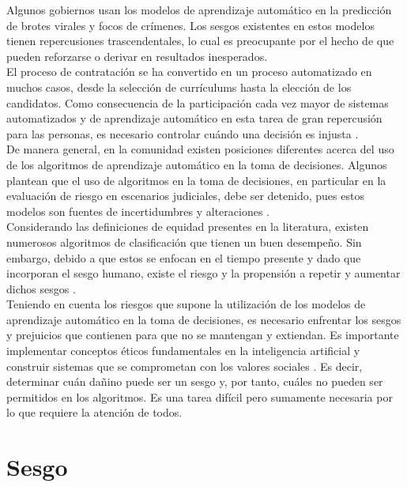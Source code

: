 \documentclass[runningheads,a4paper]{llncs}
\begin{document}
Algunos gobiernos usan los modelos de aprendizaje autom\'atico en la
predicci\'on de brotes virales y focos de cr\'imenes. Los sesgos existentes en estos modelos tienen repercusiones trascendentales, lo cual es preocupante por el hecho de que pueden reforzarse o derivar en resultados inesperados\cite{K}.\\

El proceso de contrataci\'on se ha convertido en un proceso automatizado en muchos casos, desde la selecci\'on de curr\'iculums hasta la elecci\'on de los candidatos.
Como consecuencia de la participaci\'on cada vez mayor de sistemas automatizados
y de aprendizaje autom\'atico en esta tarea de gran repercusi\'on para las personas, es
necesario controlar cu\'ando una decisi\'on es injusta \cite{Candice}.\\

De manera general, en la comunidad existen posiciones diferentes acerca del uso de
los algoritmos de aprendizaje autom\'atico en la toma de decisiones. Algunos plantean
que el uso de algoritmos en la toma de decisiones, en particular en la evaluaci\'on de
riesgo en escenarios judiciales, debe ser detenido, pues estos modelos son fuentes de
incertidumbres y alteraciones \cite{Pascal}.\\

 Considerando las definiciones de equidad presentes
en la literatura, existen numerosos algoritmos de clasificaci\'on que tienen un buen
desempe\~no. Sin embargo, debido a que estos se enfocan en el tiempo presente y dado
que incorporan el sesgo humano, existe el riesgo y la propensi\'on a repetir y aumentar
dichos sesgos \cite{Paaben}.\\

Teniendo en cuenta los riesgos que supone la utilizaci\'on de los modelos de aprendizaje
autom\'atico en la toma de decisiones, es necesario enfrentar los sesgos y prejuicios
que contienen para que no se mantengan y extiendan. Es importante implementar
conceptos \'eticos fundamentales en la inteligencia artificial \cite{Claudio} y construir sistemas que
se comprometan con los valores sociales \cite{Julia}. Es decir, determinar cu\'an dañino
puede ser un sesgo y, por tanto, cu\'ales no pueden ser permitidos en los algoritmos. Es una tarea dif\'icil pero sumamente necesaria por lo que requiere la atenci\'on de todos.

\newpage
\section{Sesgo}
\end{document}
